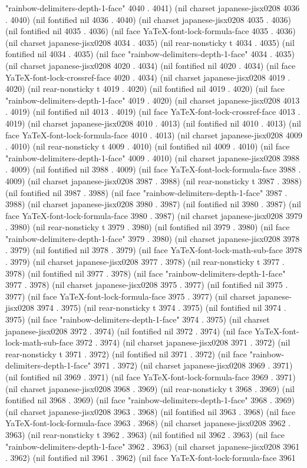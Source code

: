 "rainbow-delimiters-depth-1-face" 4040 . 4041) (nil charset japanese-jisx0208 4036 . 4040) (nil fontified nil 4036 . 4040) (nil charset japanese-jisx0208 4035 . 4036) (nil fontified nil 4035 . 4036) (nil face YaTeX-font-lock-formula-face 4035 . 4036) (nil charset japanese-jisx0208 4034 . 4035) (nil rear-nonsticky t 4034 . 4035) (nil fontified nil 4034 . 4035) (nil face "rainbow-delimiters-depth-1-face" 4034 . 4035) (nil charset japanese-jisx0208 4020 . 4034) (nil fontified nil 4020 . 4034) (nil face YaTeX-font-lock-crossref-face 4020 . 4034) (nil charset japanese-jisx0208 4019 . 4020) (nil rear-nonsticky t 4019 . 4020) (nil fontified nil 4019 . 4020) (nil face "rainbow-delimiters-depth-1-face" 4019 . 4020) (nil charset japanese-jisx0208 4013 . 4019) (nil fontified nil 4013 . 4019) (nil face YaTeX-font-lock-crossref-face 4013 . 4019) (nil charset japanese-jisx0208 4010 . 4013) (nil fontified nil 4010 . 4013) (nil face YaTeX-font-lock-formula-face 4010 . 4013) (nil charset japanese-jisx0208 4009 . 4010) (nil rear-nonsticky t 4009 . 4010) (nil fontified nil 4009 . 4010) (nil face "rainbow-delimiters-depth-1-face" 4009 . 4010) (nil charset japanese-jisx0208 3988 . 4009) (nil fontified nil 3988 . 4009) (nil face YaTeX-font-lock-formula-face 3988 . 4009) (nil charset japanese-jisx0208 3987 . 3988) (nil rear-nonsticky t 3987 . 3988) (nil fontified nil 3987 . 3988) (nil face "rainbow-delimiters-depth-1-face" 3987 . 3988) (nil charset japanese-jisx0208 3980 . 3987) (nil fontified nil 3980 . 3987) (nil face YaTeX-font-lock-formula-face 3980 . 3987) (nil charset japanese-jisx0208 3979 . 3980) (nil rear-nonsticky t 3979 . 3980) (nil fontified nil 3979 . 3980) (nil face "rainbow-delimiters-depth-1-face" 3979 . 3980) (nil charset japanese-jisx0208 3978 . 3979) (nil fontified nil 3978 . 3979) (nil face YaTeX-font-lock-math-sub-face 3978 . 3979) (nil charset japanese-jisx0208 3977 . 3978) (nil rear-nonsticky t 3977 . 3978) (nil fontified nil 3977 . 3978) (nil face "rainbow-delimiters-depth-1-face" 3977 . 3978) (nil charset japanese-jisx0208 3975 . 3977) (nil fontified nil 3975 . 3977) (nil face YaTeX-font-lock-formula-face 3975 . 3977) (nil charset japanese-jisx0208 3974 . 3975) (nil rear-nonsticky t 3974 . 3975) (nil fontified nil 3974 . 3975) (nil face "rainbow-delimiters-depth-1-face" 3974 . 3975) (nil charset japanese-jisx0208 3972 . 3974) (nil fontified nil 3972 . 3974) (nil face YaTeX-font-lock-math-sub-face 3972 . 3974) (nil charset japanese-jisx0208 3971 . 3972) (nil rear-nonsticky t 3971 . 3972) (nil fontified nil 3971 . 3972) (nil face "rainbow-delimiters-depth-1-face" 3971 . 3972) (nil charset japanese-jisx0208 3969 . 3971) (nil fontified nil 3969 . 3971) (nil face YaTeX-font-lock-formula-face 3969 . 3971) (nil charset japanese-jisx0208 3968 . 3969) (nil rear-nonsticky t 3968 . 3969) (nil fontified nil 3968 . 3969) (nil face "rainbow-delimiters-depth-1-face" 3968 . 3969) (nil charset japanese-jisx0208 3963 . 3968) (nil fontified nil 3963 . 3968) (nil face YaTeX-font-lock-formula-face 3963 . 3968) (nil charset japanese-jisx0208 3962 . 3963) (nil rear-nonsticky t 3962 . 3963) (nil fontified nil 3962 . 3963) (nil face "rainbow-delimiters-depth-1-face" 3962 . 3963) (nil charset japanese-jisx0208 3961 . 3962) (nil fontified nil 3961 . 3962) (nil face YaTeX-font-lock-formula-face 3961 